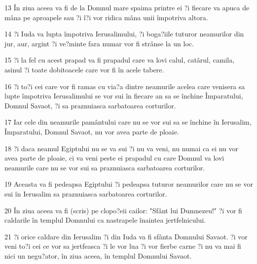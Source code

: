 \par 13 În ziua aceea va fi de la Domnul mare spaima printre ei ?i fiecare va apuca de mâna pe aproapele sau ?i î?i vor ridica mâna unii împotriva altora.
\par 14 ?i Iuda va lupta împotriva Ierusalimului, ?i boga?iile tuturor neamurilor din jur, aur, argint ?i ve?minte fara numar vor fi strânse la un loc.
\par 15 ?i la fel cu acest prapad va fi prapadul care va lovi calul, catârul, camila, asinul ?i toate dobitoacele care vor fi în acele tabere.
\par 16 ?i to?i cei care vor fi ramas cu via?a dintre neamurile acelea care venisera sa lupte împotriva Ierusalimului se vor sui în fiecare an sa se închine Împaratului, Domnul Savaot, ?i sa praznuiasca sarbatoarea corturilor.
\par 17 Iar cele din neamurile pamântului care nu se vor sui sa se închine în Ierusalim, Împaratului, Domnul Savaot, nu vor avea parte de ploaie.
\par 18 ?i daca neamul Egiptului nu se va sui ?i nu va veni, nu numai ca ei nu vor avea parte de ploaie, ci va veni peste ei prapadul cu care Domnul va lovi neamurile care nu se vor sui sa praznuiasca sarbatoarea corturilor.
\par 19 Aceasta va fi pedeapsa Egiptului ?i pedeapsa tuturor neamurilor care nu se vor sui în Ierusalim sa praznuiasca sarbatoarea corturilor.
\par 20 În ziua aceea va fi (scris) pe clopo?eii cailor: "Sfânt lui Dumnezeu!" ?i vor fi caldarile în templul Domnului ca nastrapele înaintea jertfelnicului.
\par 21 ?i orice caldare din Ierusalim ?i din Iuda va fi sfânta Domnului Savaot. ?i vor veni to?i cei ce vor sa jertfeasca ?i le vor lua ?i vor fierbe carne ?i nu va mai fi nici un negu?ator, în ziua aceea, în templul Domnului Savaot.


